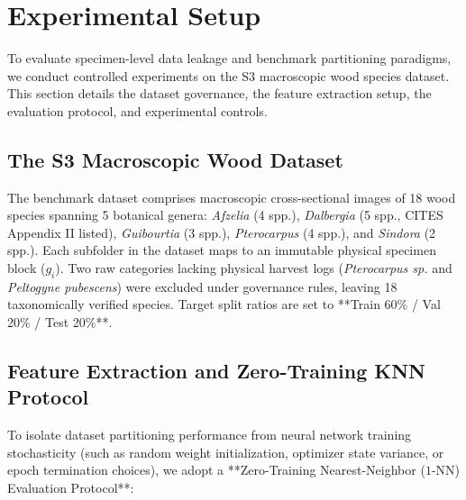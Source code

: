 \section{Experimental Setup}

To evaluate specimen-level data leakage and benchmark partitioning paradigms, we conduct controlled experiments on the S3 macroscopic wood species dataset. This section details the dataset governance, the feature extraction setup, the evaluation protocol, and experimental controls.

\subsection{The S3 Macroscopic Wood Dataset}
The benchmark dataset comprises macroscopic cross-sectional images of 18 wood species spanning 5 botanical genera: \textit{Afzelia} (4 spp.), \textit{Dalbergia} (5 spp., CITES Appendix II listed), \textit{Guibourtia} (3 spp.), \textit{Pterocarpus} (4 spp.), and \textit{Sindora} (2 spp.). Each subfolder in the dataset maps to an immutable physical specimen block ($g_i$). Two raw categories lacking physical harvest logs (\textit{Pterocarpus sp.} and \textit{Peltogyne pubescens}) were excluded under governance rules, leaving 18 taxonomically verified species. Target split ratios are set to **Train 60\% / Val 20\% / Test 20\%**.

\subsection{Feature Extraction and Zero-Training KNN Protocol}
To isolate dataset partitioning performance from neural network training stochasticity (such as random weight initialization, optimizer state variance, or epoch termination choices), we adopt a **Zero-Training Nearest-Neighbor ($1$-NN) Evaluation Protocol**:

